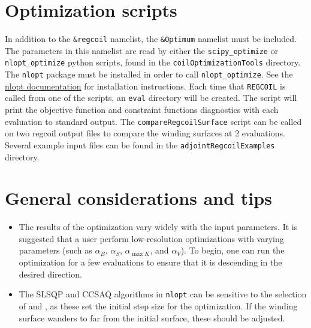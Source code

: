 \section{Optimization scripts}
In addition to the \texttt{\&regcoil} namelist, the \texttt{\&Optimum} namelist must be included. The parameters in this namelist are read by either the \texttt{scipy\_optimize} or \texttt{nlopt\_optimize} python scripts, found in the \texttt{coilOptimizationTools} directory. The \texttt{nlopt} package must be installed in order to call \texttt{nlopt\_optimize}. See the \href{https://nlopt.readthedocs.io/en/latest/#download-and-installation}{nlopt documentation} for installation instructions. Each time that \texttt{REGCOIL} is called from one of the scripts, an \texttt{eval} directory will be created. The script will print the objective function and constraint functions diagnostics with each evaluation to standard output. The \texttt{compareRegcoilSurface} script can be called on two regcoil output files to compare the winding surfaces at 2 evaluations. Several example input files can be found in the \texttt{adjointRegcoilExamples} directory.

\section{General considerations and tips}
\begin{itemize}
\item The results of the optimization vary widely with the input parameters. It is suggested that a user perform low-resolution optimizations with varying parameters (such as $\alpha_B$, $\alpha_S$, $\alpha_{\max{K}}$, and $\alpha_V$). To begin, one can run the optimization for a few evaluations to ensure that it is descending in the desired direction. 
\item The SLSQP and CCSAQ algorithms in \texttt{nlopt} can be sensitive to the selection of  and , as these set the initial step size for the optimization. If the winding surface wanders to far from the initial surface, these should be adjusted. 
\end{itemize}



